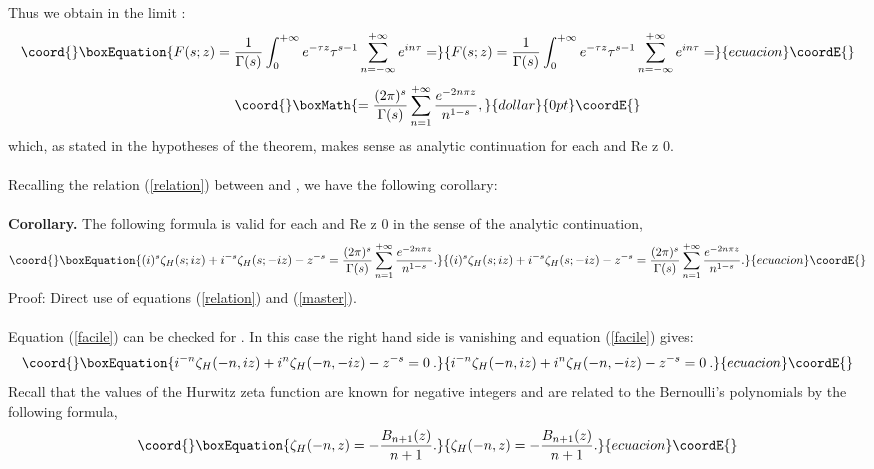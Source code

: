 \documentclass [11pt]{article}
\begin{document}
Thus we obtain in the limit \coordHE{}:
\begin{equation}\coord{}\boxEquation{\nonumber
F(s;z)=\frac{1}{\Gamma (s)}\int ^{+\infty }_{0 }e^{-\tau z}{\tau}^{s-1}\sum _{n=-\infty }^{+\infty }e^{in\tau}=
}{\nonumber
F(s;z)=\frac{1}{\Gamma (s)}\int ^{+\infty }_{0 }e^{-\tau z}{\tau}^{s-1}\sum _{n=-\infty }^{+\infty }e^{in\tau}=
}{ecuacion}\coordE{}\end{equation}
$$\coord{}\boxMath{
=\frac{(2\pi)^{s}}{\Gamma (s)}
\sum _{n=1}^{+\infty }\frac{e^{-2n\pi z}}{n^{1-s}},
}{dollar}{0pt}\coordE{}$$
which, as stated in the hypotheses of the theorem, makes sense as analytic
continuation for each \coordHE{} and Re z \myHighlight{$>$}\coordHE{}0.\\
\\
Recalling the relation (\ref{relation}) between \coordHE{} and \coordHE{}, we have the following corollary:\\
\\
{\bf Corollary.} 
The following formula is valid for each \coordHE{}  \coordHE{} and Re z \myHighlight{$>$}\coordHE{} 0 in the sense of the analytic continuation,\\
\begin{equation}\coord{}\boxEquation{
\label{facile}
(i)^{s}\zeta _{H}(s;iz)+i^{-s}\zeta _{H}(s;-iz)-z^{-s}=\frac{(2\pi )^{s}}{\Gamma (s)}\sum _{n=1}^{+\infty}\frac{e^{-2n\pi{z}}}{n^{1-s}}.
}{
(i)^{s}\zeta _{H}(s;iz)+i^{-s}\zeta _{H}(s;-iz)-z^{-s}=\frac{(2\pi )^{s}}{\Gamma (s)}\sum _{n=1}^{+\infty}\frac{e^{-2n\pi{z}}}{n^{1-s}}.
}{ecuacion}\coordE{}\end{equation}
Proof: Direct use of equations (\ref{relation}) and (\ref{master}).
\\
\\
Equation (\ref{facile}) can be checked for \coordHE{}. In this case the right hand side is vanishing and
equation (\ref{facile}) gives:
\begin{equation}\coord{}\boxEquation{
{i}^{-n}\zeta_H(-n,iz) +i^{n}\zeta_H(-n,-iz) - z^{-s} = 0\:.
}{
{i}^{-n}\zeta_H(-n,iz) +i^{n}\zeta_H(-n,-iz) - z^{-s} = 0\:.
}{ecuacion}\coordE{}\end{equation}
Recall that the values of the Hurwitz zeta function are known for negative integers and are related to the
Bernoulli's polynomials by the following
 formula,
\begin{equation}\coord{}\boxEquation{
\zeta_H(-n,z)=-\frac{B_{n+1}(z)}{n+1}.
}{
\zeta_H(-n,z)=-\frac{B_{n+1}(z)}{n+1}.
}{ecuacion}\coordE{}\end{equation}
\end{document}
